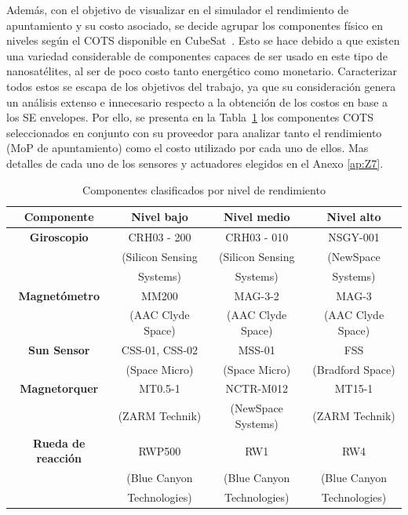 Además, con el objetivo de visualizar en el simulador el rendimiento de apuntamiento y su costo asociado, se decide agrupar los componentes físico en niveles según el \gls{COTS} disponible en CubeSat~\cite{ref45}. Esto se hace debido a que existen una variedad considerable de componentes capaces de ser usado en este tipo de nanosatélites, al ser de poco costo tanto energético como monetario. Caracterizar todos estos se escapa de los objetivos del trabajo, ya que su consideración genera un análisis extenso e innecesario respecto a la obtención de los costos en base a los SE envelopes. Por ello, se presenta en la Tabla~\ref{tab:niveles} los componentes \gls{COTS} seleccionados en conjunto con su proveedor para analizar tanto el rendimiento (MoP de apuntamiento) como el costo utilizado por cada uno de ellos. Mas detalles de cada uno de los sensores y actuadores elegidos en el Anexo \ref{ap:Z7}.

\begin{table}[h!]
	\centering
	\caption{Componentes clasificados por nivel de rendimiento}
	\begin{tabular}{|c|c|c|c|}
		\hline
		\textbf{Componente}   & \textbf{Nivel bajo} & \textbf{Nivel medio} & \textbf{Nivel alto} \\ 
		\hline
		\textbf{Giroscopio}   & CRH03 - 200  & CRH03 - 010  & NSGY-001   \\
		& (Silicon Sensing  & (Silicon Sensing & (NewSpace \\
		& Systems) & Systems) & Systems) \\
		\hline
		\textbf{Magnetómetro} & MM200 & MAG-3-2 & MAG-3  \\
		& (AAC Clyde Space) & (AAC Clyde Space) & (AAC Clyde Space) \\
		\hline
		\textbf{Sun Sensor}   & CSS-01, CSS-02  & MSS-01 & FSS  \\
		& (Space Micro)   & (Space Micro) & (Bradford Space) \\
		\hline
		\textbf{Magnetorquer} & MT0.5-1 & NCTR-M012 & MT15-1 \\
		& (ZARM Technik) & (NewSpace Systems) & (ZARM Technik) \\
		\hline
		\textbf{Rueda de reacción} & RWP500 & RW1  & RW4  \\
		& (Blue Canyon & (Blue Canyon & (Blue Canyon \\
		& Technologies) & Technologies) & Technologies) \\
		\hline
	\end{tabular}
	\label{tab:niveles}
\end{table}


